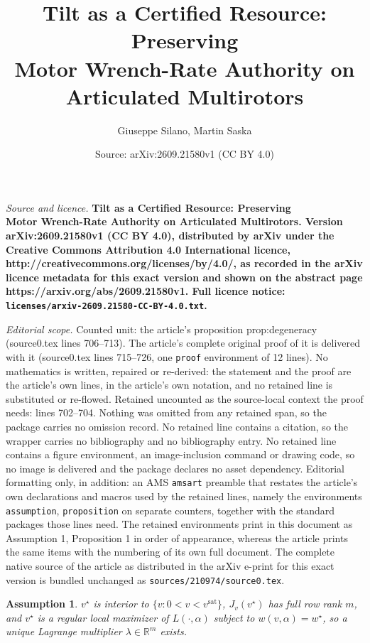 \documentclass[10pt,a4paper]{amsart}
\title{\LARGE \bf Tilt as a Certified Resource: Preserving\\ Motor Wrench-Rate Authority on Articulated Multirotors}
\author{Giuseppe Silano, Martin Saska}
\date{Source: arXiv:2609.21580v1 (CC BY 4.0)}
\newtheorem{assumption}{Assumption}
\begin{document}
\maketitle

\noindent\emph{Source and licence.} \LARGE \bf Tilt as a Certified Resource: Preserving\\ Motor Wrench-Rate Authority on Articulated Multirotors. Version arXiv:2609.21580v1 (CC BY 4.0), distributed by arXiv under the Creative Commons Attribution 4.0 International licence, http://creativecommons.org/licenses/by/4.0/, as recorded in the arXiv licence metadata for this exact version and shown on the abstract page https://arxiv.org/abs/2609.21580v1. Full licence notice: \texttt{licenses/arxiv-2609.21580-CC-BY-4.0.txt}.\par\smallskip

\noindent\textit{Editorial scope.} Counted unit: the article's proposition prop:degeneracy (source0.tex lines 706--713). The article's complete original proof of it is delivered with it (source0.tex lines 715--726, one \texttt{proof} environment of 12 lines). No mathematics is written, repaired or re-derived: the statement and the proof are the article's own lines, in the article's own notation, and no retained line is substituted or re-flowed.  Retained uncounted as the source-local context the proof needs: lines 702--704.  Nothing was omitted from any retained span, so the package carries no omission record.  No retained line contains a citation, so the wrapper carries no bibliography and no bibliography entry.  No retained line contains a figure environment, an image-inclusion command or drawing code, so no image is delivered and the package declares no asset dependency.  Editorial formatting only, in addition: an AMS \texttt{amsart} preamble that restates the article's own declarations and macros used by the retained lines, namely the environments \texttt{assumption}, \texttt{proposition} on separate counters, together with the standard packages those lines need.  The retained environments print in this document as Assumption 1, Proposition 1 in order of appearance, whereas the article prints the same items with the numbering of its own full document.  The complete native source of the article as distributed in the arXiv e-print for this exact version is bundled unchanged as \texttt{sources/210974/source0.tex}.
\begin{assumption}\label{as:regular}
$v^\star$ is interior to $\{v: 0<v<v^{\mathrm{sat}}\}$, $J_v(v^\star)$ has full row rank $m$, and $v^\star$ is a regular local maximizer of $L(\cdot,\alpha)$ subject to $w(v,\alpha)=w^\star$, so a unique Lagrange multiplier $\lambda\in\mathbb{R}^m$ exists.
\end{assumption}
\end{document}
